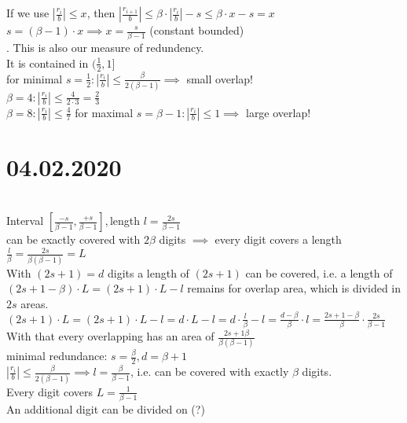 \begin{itemize}
    If we use $|\frac{r_i}{b}|\le x$, then $|\frac{r_{i+1}}{b}|\le \beta \cdot |\frac{r_i}{b}|-s\le \beta \cdot x-s=x$ \\
    \implies $s=(\beta-1)\cdot x \implies x=\frac{s}{\beta-1}$ (constant bounded) \\
   
    .
    This is also our measure of redundency. \\
    It is contained in $(\frac{1}{2},1]$ \\
    for minimal $s=\frac{1}{2}: |\frac{r_i}{b}|\le \frac{\beta}{2(\beta-1)} \implies $ small overlap! \\
    $\beta=4: |\frac{r_i}{b}|\le \frac{4}{2\cdot 3}=\frac{2}{3}$ \\
    $\beta=8: |\frac{r_i}{b}|\le \frac{4}{7}$
    for maximal $s=\beta-1: |\frac{r_i}{b}|\le 1\implies$ large overlap!
\end{itemize}

\section*{04.02.2020} \\
Interval $[\frac{-s}{\beta-1}, \frac{+s}{\beta-1}], $length $l=\frac{2s}{\beta-1}$ \\
can be exactly covered with $2\beta$ digits $\implies$ every digit covers a length $\frac{l}{\beta}=\frac{2s}{\beta(\beta-1)}=L$ \\
With $(2s+1)=d$ digits a length of $(2s+1)$ can be covered, i.e. a length of $(2s+1-\beta)\cdot L=(2s+1)\cdot L-l$ remains for overlap area, which is divided in $2s$ areas. \\

$(2s+1)\cdot L=(2s+1)\cdot L-l=d\cdot L-l=d\cdot \frac{l}{\beta}-l=\frac{d-\beta}{\beta}\cdot l=\frac{2s+1-\beta}{\beta}\cdot \frac{2s}{\beta-1}$ \\

With that every overlapping has an area of $\frac{2s+1\beta}{\beta(\beta-1)}$ \\
minimal redundance: $s=\frac{\beta}{2}, d=\beta+1$ \\
$|\frac{r_i}{b}|\le \frac{\beta}{2(\beta-1)}\implies l=\frac{\beta}{\beta-1}$, i.e. can be covered with exactly $\beta$ digits. \\

Every digit covers $L=\frac{1}{\beta-1}$ \\
An additional digit can be divided on (?) \\

